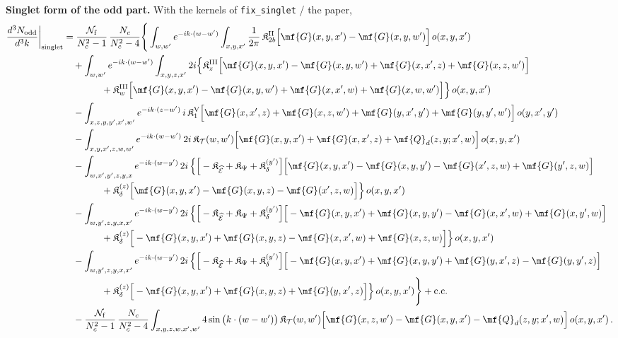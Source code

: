 \noindent\textbf{Singlet form of the odd part.} With the kernels of \texttt{fix\_singlet} / the paper,
\begin{align}
\frac{d^{3}N_{\rm odd}}{d^{3}k}\bigg|_{\rm singlet}&=\frac{\mathcal{N}_{\rm f}}{N_{c}^{2}-1}\,\frac{N_{c}}{N_{c}^{2}-4}\Bigg\{\int_{w,w'}e^{-ik\cdot(w-w')}\int_{x,y,x'}\frac{1}{2\pi}\,\mathfrak{K}^{\rm II}_{2b}\Big[\mf{G}(x,y,x')-\mf{G}(x,y,w')\Big]\,o(x,y,x')\notag\\
&\quad+\int_{w,w'}e^{-ik\cdot(w-w')}\int_{x,y,z,x'}2i\Big\{\mathfrak{K}^{\rm III}_{z}\Big[\mf{G}(x,y,x')-\mf{G}(x,y,w')+\mf{G}(x,x',z)+\mf{G}(x,z,w')\Big]\notag\\
&\qquad\qquad+\mathfrak{K}^{\rm III}_{w}\Big[\mf{G}(x,y,x')-\mf{G}(x,y,w')+\mf{G}(x,x',w)+\mf{G}(x,w,w')\Big]\Big\}\,o(x,y,x')\notag\\
&\quad-\int_{x,z,y,y',x',w'}e^{-ik\cdot(z-w')}\,i\,\mathfrak{K}^{\rm V}_{1}\Big[\mf{G}(x,x',z)+\mf{G}(x,z,w')+\mf{G}(y,x',y')+\mf{G}(y,y',w')\Big]\,o(y,x',y')\notag\\
&\quad-\int_{x,y,x',z,w,w'}e^{-ik\cdot(w-w')}\,2i\,\mathfrak{K}_{\mathcal{T}}(w,w')\Big[\mf{G}(x,y,x')+\mf{G}(x,x',z)+\mf{Q}_{d}(z,y;x',w)\Big]\,o(x,y,x')\notag\\
&\quad-\int_{w,x',y',z,y,x}e^{-ik\cdot(w-y')}\,2i\,\Big\{\Big[-\mathfrak{K}_{\widehat{\mathcal{E}}}+\mathfrak{K}_{\Psi}+\mathfrak{K}^{(y')}_{\delta}\Big]\Big[\mf{G}(x,y,x')-\mf{G}(x,y,y')-\mf{G}(x',z,w)+\mf{G}(y',z,w)\Big]\notag\\
&\qquad\qquad+\mathfrak{K}^{(z)}_{\delta}\Big[\mf{G}(x,y,x')-\mf{G}(x,y,z)-\mf{G}(x',z,w)\Big]\Big\}\,o(x,y,x')\notag\\
&\quad-\int_{w,y',z,y,x,x'}e^{-ik\cdot(w-y')}\,2i\,\Big\{\Big[-\mathfrak{K}_{\widehat{\mathcal{E}}}+\mathfrak{K}_{\Psi}+\mathfrak{K}^{(y')}_{\delta}\Big]\Big[-\mf{G}(x,y,x')+\mf{G}(x,y,y')-\mf{G}(x,x',w)+\mf{G}(x,y',w)\Big]\notag\\
&\qquad\qquad+\mathfrak{K}^{(z)}_{\delta}\Big[-\mf{G}(x,y,x')+\mf{G}(x,y,z)-\mf{G}(x,x',w)+\mf{G}(x,z,w)\Big]\Big\}\,o(x,y,x')\notag\\
&\quad-\int_{w,y',z,y,x,x'}e^{-ik\cdot(w-y')}\,2i\,\Big\{\Big[-\mathfrak{K}_{\widehat{\mathcal{E}}}+\mathfrak{K}_{\Psi}+\mathfrak{K}^{(y')}_{\delta}\Big]\Big[-\mf{G}(x,y,x')+\mf{G}(x,y,y')+\mf{G}(y,x',z)-\mf{G}(y,y',z)\Big]\notag\\
&\qquad\qquad+\mathfrak{K}^{(z)}_{\delta}\Big[-\mf{G}(x,y,x')+\mf{G}(x,y,z)+\mf{G}(y,x',z)\Big]\Big\}\,o(x,y,x')\Bigg\}+{\rm c.c.}\notag\\
&\quad-\frac{\mathcal{N}_{\rm f}}{N_{c}^{2}-1}\,\frac{N_{c}}{N_{c}^{2}-4}\int_{x,y,z,w,x',w'}4\sin\big(k\cdot(w-w')\big)\,\mathfrak{K}_{\mathcal{T}}(w,w')\Big[\mf{G}(x,z,w')-\mf{G}(x,y,x')-\mf{Q}_{d}(z,y;x',w)\Big]\,o(x,y,x')\,.\label{eq:dabc-odd}
\end{align}
